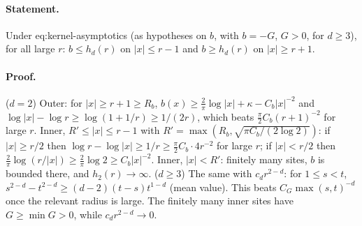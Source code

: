 \paragraph{Statement.} Under eq:kernel-asymptotics (as hypotheses on $b$, with $b=-G$, $G>0$, for $d\geq3$), for all
large $r$: $b\leq h_d(r)$ on $|x|\leq r-1$ and $b\geq h_d(r)$ on $|x|\geq r+1$.
\paragraph{Proof.} ($d=2$) Outer: for $|x|\geq r+1\geq R_b$, $b(x)\geq\frac2\pi\log|x|+\kappa-C_b|x|^{-2}$ and
$\log|x|-\log r\geq\log(1+1/r)\geq1/(2r)$, which beats $\frac\pi2C_b(r+1)^{-2}$ for large $r$. Inner, $R'\leq|x|\leq r-1$
with $R'=\max(R_b,\sqrt{\pi C_b/(2\log2)})$: if $|x|\geq r/2$ then $\log r-\log|x|\geq1/r\geq\frac\pi2C_b\cdot4r^{-2}$ for large
$r$; if $|x|<r/2$ then $\frac2\pi\log(r/|x|)\geq\frac2\pi\log2\geq C_b|x|^{-2}$. Inner, $|x|<R'$: finitely many sites, $b$ is
bounded there, and $h_2(r)\to\infty$. ($d\geq3$) The same with $c_dr^{2-d}$: for $1\leq s<t$,
$s^{2-d}-t^{2-d}\geq(d-2)(t-s)t^{1-d}$ (mean value). This beats $C_G\max(s,t)^{-d}$ once the relevant radius is large. The
finitely many inner sites have $G\geq\min G>0$, while $c_dr^{2-d}\to0$.
